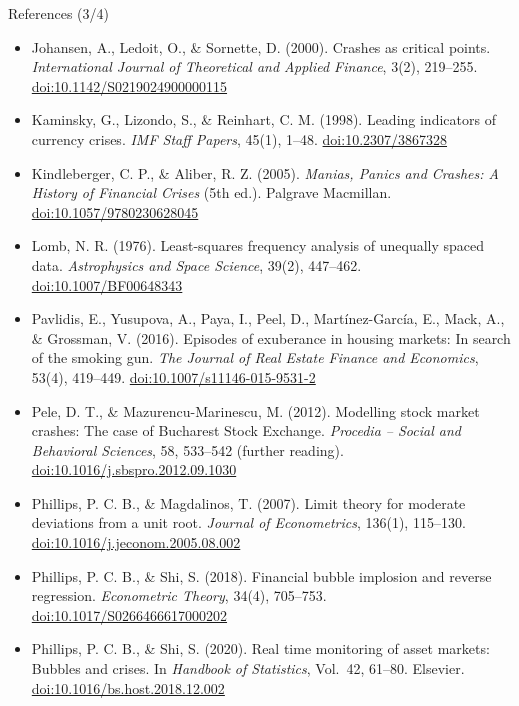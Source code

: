 \begin{frame}{References (3/4)}
\itemsize{\tiny}
\begin{itemize}
    \item Johansen, A., Ledoit, O., \& Sornette, D. (2000). Crashes as critical points. \textit{International Journal of Theoretical and Applied Finance}, 3(2), 219--255. \href{https://doi.org/10.1142/S0219024900000115}{doi:10.1142/S0219024900000115}
    \item Kaminsky, G., Lizondo, S., \& Reinhart, C. M. (1998). Leading indicators of currency crises. \textit{IMF Staff Papers}, 45(1), 1--48. \href{https://doi.org/10.2307/3867328}{doi:10.2307/3867328}
    \item Kindleberger, C. P., \& Aliber, R. Z. (2005). \textit{Manias, Panics and Crashes: A History of Financial Crises} (5th ed.). Palgrave Macmillan. \href{https://doi.org/10.1057/9780230628045}{doi:10.1057/9780230628045}
    \item Lomb, N. R. (1976). Least-squares frequency analysis of unequally spaced data. \textit{Astrophysics and Space Science}, 39(2), 447--462. \href{https://doi.org/10.1007/BF00648343}{doi:10.1007/BF00648343}
    \item Pavlidis, E., Yusupova, A., Paya, I., Peel, D., Martínez-García, E., Mack, A., \& Grossman, V. (2016). Episodes of exuberance in housing markets: In search of the smoking gun. \textit{The Journal of Real Estate Finance and Economics}, 53(4), 419--449. \href{https://doi.org/10.1007/s11146-015-9531-2}{doi:10.1007/s11146-015-9531-2}
    \item Pele, D. T., \& Mazurencu-Marinescu, M. (2012). Modelling stock market crashes: The case of Bucharest Stock Exchange. \textit{Procedia -- Social and Behavioral Sciences}, 58, 533--542 (further reading). \href{https://doi.org/10.1016/j.sbspro.2012.09.1030}{doi:10.1016/j.sbspro.2012.09.1030}
    \item Phillips, P. C. B., \& Magdalinos, T. (2007). Limit theory for moderate deviations from a unit root. \textit{Journal of Econometrics}, 136(1), 115--130. \href{https://doi.org/10.1016/j.jeconom.2005.08.002}{doi:10.1016/j.jeconom.2005.08.002}
    \item Phillips, P. C. B., \& Shi, S. (2018). Financial bubble implosion and reverse regression. \textit{Econometric Theory}, 34(4), 705--753. \href{https://doi.org/10.1017/S0266466617000202}{doi:10.1017/S0266466617000202}
    \item Phillips, P. C. B., \& Shi, S. (2020). Real time monitoring of asset markets: Bubbles and crises. In \textit{Handbook of Statistics}, Vol.\ 42, 61--80. Elsevier. \href{https://doi.org/10.1016/bs.host.2018.12.002}{doi:10.1016/bs.host.2018.12.002}

\end{itemize}
\end{frame}
